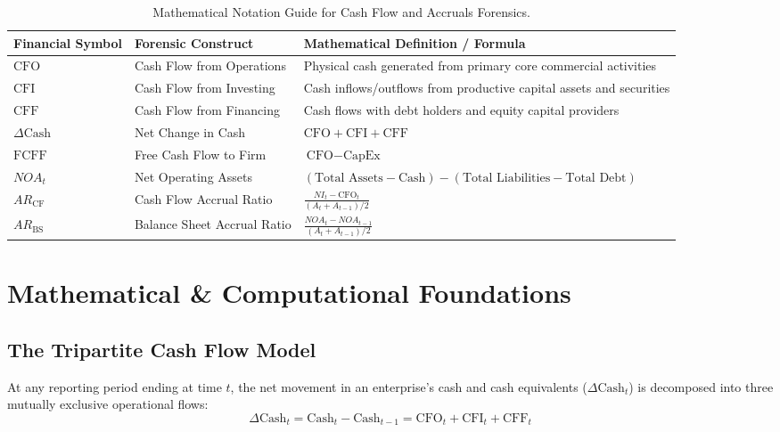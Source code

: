 \begin{table}[htbp]
\centering
\small
\begin{tabularx}{\textwidth}{llX}
\toprule
\textbf{Financial Symbol} & \textbf{Forensic Construct} & \textbf{Mathematical Definition / Formula} \\
\midrule
$\text{CFO}$ & Cash Flow from Operations & Physical cash generated from primary core commercial activities \\
$\text{CFI}$ & Cash Flow from Investing & Cash inflows/outflows from productive capital assets and securities \\
$\text{CFF}$ & Cash Flow from Financing & Cash flows with debt holders and equity capital providers \\
$\Delta \text{Cash}$ & Net Change in Cash & $\text{CFO} + \text{CFI} + \text{CFF}$ \\
$\text{FCFF}$ & Free Cash Flow to Firm & $\text{CFO} - \text{CapEx}$ \\
$NOA_t$ & Net Operating Assets & $(\text{Total Assets} - \text{Cash}) - (\text{Total Liabilities} - \text{Total Debt})$ \\
$AR_{\text{CF}}$ & Cash Flow Accrual Ratio & $\frac{NI_t - \text{CFO}_t}{(A_t + A_{t-1}) / 2}$ \\
$AR_{\text{BS}}$ & Balance Sheet Accrual Ratio & $\frac{NOA_t - NOA_{t-1}}{(A_t + A_{t-1}) / 2}$ \\
\bottomrule
\end{tabularx}
\caption{Mathematical Notation Guide for Cash Flow and Accruals Forensics.}
\label{tab:w3_notation}
\end{table}

\section{Mathematical \& Computational Foundations}

\subsection{The Tripartite Cash Flow Model}
At any reporting period ending at time $t$, the net movement in an enterprise's cash and cash equivalents ($\Delta \text{Cash}_t$) is decomposed into three mutually exclusive operational flows:
\begin{equation}
\Delta \text{Cash}_t = \text{Cash}_t - \text{Cash}_{t-1} = \text{CFO}_t + \text{CFI}_t + \text{CFF}_t
\label{eq:cash_tripartite}
\end{equation}

